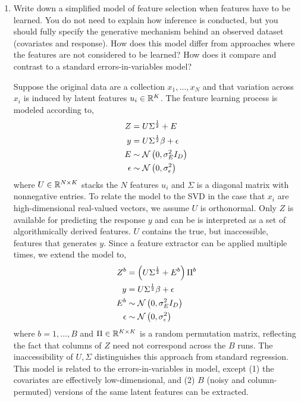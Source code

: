\documentclass[]{article}
\begin{document}
\begin{enumerate}

\item Write down a simplified model of feature selection when features have to
be learned. You do not need to explain how inference is conducted, but you
should fully specify the generative mechanism behind an observed dataset
(covariates and response). How does this model differ from approaches where the
features are not considered to be learned? How does it compare and contrast to a
standard errors-in-variables model?

Suppose the original data are a collection $x_{1}, \dots, x_{N}$ and that
variation across $x_{i}$ is induced by latent features $u_{i} \in
\mathbb{R}^{K}$. The feature learning process is modeled according to,
\begin{align*}
Z &= U\Sigma^\frac{1}{2} + E \\
y &= U\Sigma^\frac{1}{2} \beta + \epsilon \\
 E &\sim \mathcal{N}\left(0, \sigma_{E}^2 I_{D}\right) \\
\epsilon &\sim \mathcal{N}\left(0, \sigma_{\epsilon}^2\right)
\end{align*}
where $U \in \mathbb{R}^{N \times K}$ stacks the $N$ features $u_i$ and
$\Sigma$ is a diagonal matrix with nonnegative entries. To relate the model to
the SVD in the case that $x_i$ are high-dimensional real-valued vectors, we
assume $U$ is orthonormal. Only $Z$ is available for predicting the response
$y$ and can be is interpreted as a set of algorithmically derived features.
$U$ contains the true, but inaccessible, features that generates $y$. Since a
feature extractor can be applied multiple times, we extend the model to,
\begin{align*}
Z^{b} &= \left(U\Sigma^\frac{1}{2} + E^{b}\right)\Pi^{b} \\
y &= U\Sigma^\frac{1}{2} \beta + \epsilon \\
 E^{b} &\sim \mathcal{N}\left(0, \sigma_{E}^2 I_{D}\right) \\
\epsilon &\sim \mathcal{N}\left(0, \sigma_{\epsilon}^2\right)
\end{align*}
where $b = 1, \dots, B$ and $\Pi \in \mathbb{R}^{K \times K}$ is a random
permutation matrix, reflecting the fact that columns of $Z$ need not correspond
across the $B$ runs. The inaccessibility of $U, \Sigma$ distinguishes this
approach from standard regression. This model is related to the
errors-in-variables in model, except (1) the covariates are effectively
low-dimensional, and (2) $B$ (noisy and column-permuted) versions of the same
latent features can be extracted.


\end{enumerate}
\end{document}
